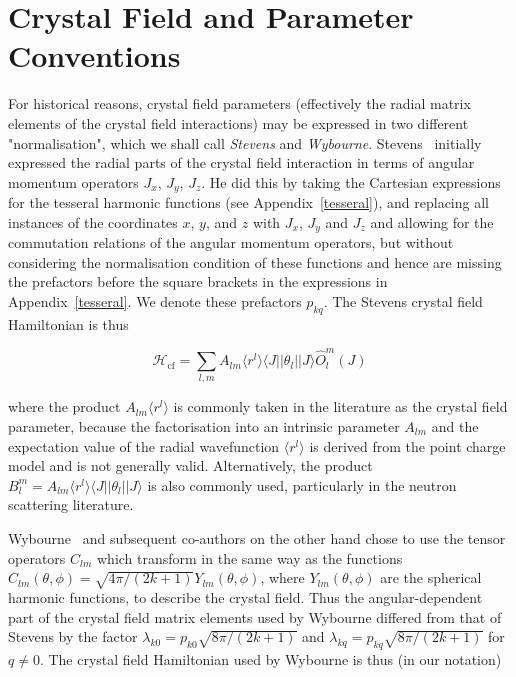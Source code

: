\section{Crystal Field and Parameter Conventions}\label{cfparconventions}

For historical reasons, crystal field parameters (effectively the radial matrix elements of the crystal field
interactions) may be expressed in two different "normalisation", which we shall call \emph{Stevens} and 
\emph{Wybourne}. Stevens~\cite{stevens52-209,hutchings64-227} initially expressed the radial parts of the crystal field interaction
in terms of angular momentum operators $J_x$, $J_y$, $J_z$. He did this by taking the Cartesian expressions for 
the tesseral harmonic functions (see Appendix~\ref{tesseral}), and replacing all instances of the coordinates
$x$, $y$, and $z$ with $J_x$, $J_y$ and $J_z$ and allowing for the commutation relations of the angular
momentum operators, but without considering the normalisation condition of these functions and hence are missing
the prefactors before the square brackets in the expressions in Appendix~\ref{tesseral}. We denote these
prefactors $p_{kq}$. The Stevens crystal field Hamiltonian is thus

\[
\mathcal{H}_{\mathrm{cf}} = \sum_{l,m} A_{lm} \langle r^l \rangle \langle J || \theta_l || J \rangle \hat{O}_l^m (J)
\]

\noindent where the product $A_{lm} \langle r^l \rangle$ is commonly taken in the literature as the crystal
field parameter, because the factorisation into an intrinsic parameter $A_{lm}$ and the expectation value of
the radial wavefunction $\langle r^l \rangle$ is derived from the point charge model and is not generally
valid. Alternatively, the product $B_l^m = A_{lm} \langle r^l \rangle \langle J || \theta_l || J \rangle$ is
also commonly used, particularly in the neutron scattering literature.

Wybourne~\cite{wybourne65} and subsequent co-authors on the other hand chose to use the tensor operators 
$\hat{C}_{lm}$ which transform in the same way as the functions $C_{lm}(\theta,\phi) = \sqrt{4\pi / (2k+1)}
Y_{lm}(\theta,\phi)$, where $Y_{lm}(\theta,\phi)$ are the spherical harmonic functions, to describe the crystal
field. Thus the angular-dependent part of the crystal field matrix elements used by Wybourne differed from
that of Stevens by the factor $\lambda_{k0} = p_{k0} \sqrt{8\pi / (2k+1)}$ and
 $\lambda_{kq} = p_{kq} \sqrt{8\pi / (2k+1)}$ for $q\neq 0$. The crystal field Hamiltonian used by Wybourne is
thus (in our notation)


